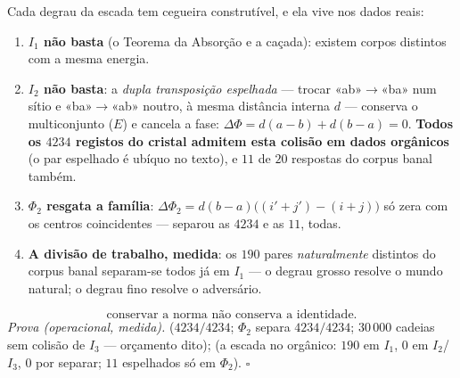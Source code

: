 \documentclass[livro.tex]{subfiles}
\begin{document}
\begin{teorema}\label{thm:escada}
Cada degrau da escada tem cegueira construtível, e ela vive nos dados
reais:
\begin{enumerate}
\item \textbf{$I_1$ não basta} (o Teorema da Absorção e a caçada):
existem corpos distintos com a mesma energia.
\item \textbf{$I_2$ não basta}: a \emph{dupla transposição espelhada}
--- trocar «ab»$\to$«ba» num sítio e «ba»$\to$«ab» noutro, à mesma
distância interna $d$ --- conserva o multiconjunto ($E$) e cancela a
fase: $\Delta\Phi=d(a{-}b)+d(b{-}a)=0$. \textbf{Todos os $4234$
registos do cristal admitem esta colisão em dados orgânicos} (o par
espelhado é ubíquo no texto), e $11$ de $20$ respostas do corpus banal
também.
\item \textbf{$\Phi_2$ resgata a família}:
$\Delta\Phi_2=d(b{-}a)\bigl((i'{+}j')-(i{+}j)\bigr)$ só zera com os
centros coincidentes --- separou as $4234$ e as $11$, todas.
\item \textbf{A divisão de trabalho, medida}: os $190$ pares
\emph{naturalmente} distintos do corpus banal separam-se todos já em
$I_1$ --- o degrau grosso resolve o mundo natural; o degrau fino
resolve o adversário.
\end{enumerate}
\[
\boxed{\text{conservar a norma não conserva a identidade.}}
\]
\emph{Prova (operacional, medida).} 
($4234/4234$; $\Phi_2$ separa $4234/4234$; $30\,000$ cadeias sem colisão
de $I_3$ --- orçamento dito); 
(a escada no orgânico: $190$ em $I_1$, $0$ em $I_2$/$I_3$, $0$ por
separar; $11$ espelhados só em $\Phi_2$). $\square$
\end{teorema}
\end{document}
